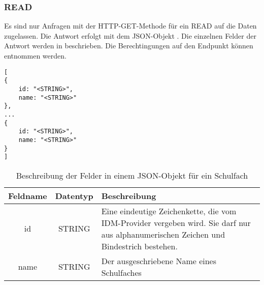 \subsubsection{READ}
\label{sec:end:rest:api:school-subjects:read}
Es sind nur Anfragen mit der HTTP-GET-Methode für ein READ auf die Daten zugelassen.
Die Antwort erfolgt mit dem JSON-Objekt . Die einzelnen Felder der Antwort werden in  beschrieben.
Die Berechtingungen auf den Endpunkt können  entnommen werden.

\begin{lstlisting}[caption={JSON-Antwort für einen GET-Aufruf des Pfads /api/school-subjects},label={lst:code:end:rest:api:school-subjects:read:ret},frame=tlrb]
[
{
	id: "<STRING>",
	name: "<STRING>"
},
...
{
	id: "<STRING>",
	name: "<STRING>"
}
]
\end{lstlisting}
\begin{table}[htb]
	\begin{tabularx}{\textwidth}{|c|c|X|}
		\hline
			\textbf{Feldname} & \textbf{Datentyp} & \textbf{Beschreibung} \\ \hline
			id & STRING & Eine eindeutige Zeichenkette, die vom IDM-Provider vergeben wird. Sie darf nur aus alphanumerischen Zeichen und Bindestrich bestehen.\\ \hline
			name & STRING & Der ausgeschriebene Name eines Schulfaches \\ \hline
	\end{tabularx}

		\caption{Beschreibung der Felder in einem JSON-Objekt für ein Schulfach}
		\label{tab:end:rest:api:school-subjects:read:ret:json}
\end{table}